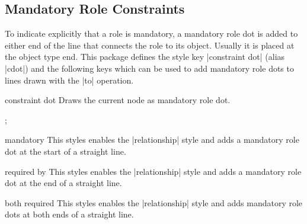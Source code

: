 \documentclass[a4paper,10pt]{article}
\begin{document}
\subsection{Mandatory Role Constraints}
\label{sec:mandatoryconstraints}
To indicate explicitly that a role is mandatory, a mandatory role dot is added to either end of the line that connects the role to its object. Usually it is placed at the object type end. This package defines the style key |constraint dot| (alias |cdot|) and the following keys which can be used to add mandatory role dots to lines drawn with the |to| operation.

\begin{stylekey}{constraint dot}
Draws the current node as mandatory role dot.
\begin{codeexample}[]
\tikz \node[cdot] {};
\end{codeexample}
\end{stylekey}

\begin{stylekey}{mandatory}
This styles enables the |relationship| style and adds a mandatory role dot at the start of a straight line.
\begin{codeexample}[]
\end{codeexample}
\end{stylekey}

\begin{stylekey}{required by}
This styles enables the |relationship| style and adds a mandatory role dot at the end of a straight line.
\begin{codeexample}[]
\end{codeexample}
\end{stylekey}

\begin{stylekey}{both required}
This styles enables the |relationship| style and adds mandatory role dots at both ends of a straight line.
\begin{codeexample}[]
\end{codeexample}
\end{stylekey}
\end{document}
